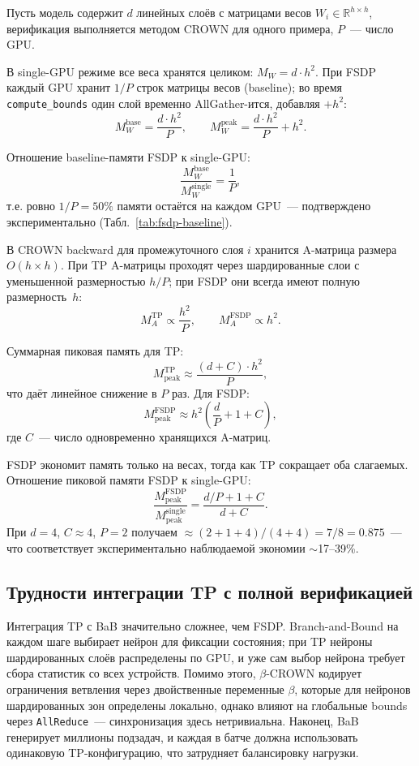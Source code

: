 Пусть модель содержит $d$ линейных слоёв с матрицами весов
$W_i \in \mathbb{R}^{h \times h}$, верификация выполняется методом
CROWN для одного примера, $P$~--- число GPU.

В single-GPU режиме все веса хранятся целиком: $M_W = d \cdot h^2$.
При FSDP каждый GPU хранит $1/P$ строк матрицы весов
(baseline); во время \texttt{compute\_bounds} один слой временно
AllGather-ится, добавляя $+h^2$:
$$M_W^{\text{base}} = \frac{d \cdot h^2}{P}, \qquad
  M_W^{\text{peak}} = \frac{d \cdot h^2}{P} + h^2.$$

Отношение baseline-памяти FSDP к single-GPU:
$$\frac{M_W^{\text{base}}}{M_W^{\text{single}}} = \frac{1}{P},$$
т.е. ровно $1/P = 50\%$ памяти остаётся на каждом GPU~---
подтверждено экспериментально (Табл.~\ref{tab:fsdp-baseline}).

В CROWN backward для промежуточного слоя $i$ хранится A-матрица
размера $O(h \times h)$. При TP A-матрицы проходят через
шардированные слои с уменьшенной размерностью $h/P$; при FSDP они
всегда имеют полную размерность~$h$:
$$M_A^{\text{TP}} \propto \frac{h^2}{P}, \qquad
  M_A^{\text{FSDP}} \propto h^2.$$

Суммарная пиковая память для TP:
$$M_{\text{peak}}^{\text{TP}} \approx
    \frac{(d + C) \cdot h^2}{P},$$
что даёт линейное снижение в $P$ раз. Для FSDP:
$$M_{\text{peak}}^{\text{FSDP}} \approx
    h^2 \!\left(\frac{d}{P} + 1 + C\right),$$
где $C$~--- число одновременно хранящихся A-матриц.

FSDP экономит память только на весах, тогда как TP сокращает оба
слагаемых. Отношение пиковой памяти FSDP к single-GPU:
$$\frac{M_{\text{peak}}^{\text{FSDP}}}{M_{\text{peak}}^{\text{single}}}
    = \frac{d/P + 1 + C}{d + C}.$$
При $d = 4$, $C \approx 4$, $P = 2$ получаем
$\approx (2 + 1 + 4)/(4 + 4) = 7/8 = 0.875$~---
что соответствует экспериментально наблюдаемой экономии $\sim$17--39\%.

\subsection{Трудности интеграции TP с полной верификацией}

Интеграция TP с BaB значительно сложнее, чем FSDP. Branch-and-Bound
на каждом шаге выбирает нейрон для фиксации состояния; при TP нейроны
шардированных слоёв распределены по GPU, и уже сам выбор нейрона
требует сбора статистик со всех устройств. Помимо этого, $\beta$-CROWN
кодирует ограничения ветвления через двойственные переменные $\beta$,
которые для нейронов шардированных зон определены локально, однако
влияют на глобальные bounds через \texttt{AllReduce}~--- синхронизация
здесь нетривиальна. Наконец, BaB генерирует миллионы подзадач, и
каждая в батче должна использовать одинаковую TP-конфигурацию,
что затрудняет балансировку нагрузки.

